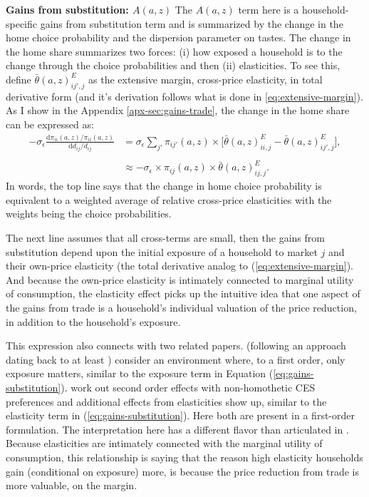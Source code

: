 \documentclass[12pt,pdftex]{article}
\begin{document}
\begin{onehalfspacing}
\textbf{Gains from substitution: $A(a,z)$} The $A(a,z)$ term here is a household-specific gains from substitution term and is summarized by the change in the home choice probability and the dispersion parameter on tastes. The change in the home share summarizes two forces: (i) how exposed a household is to the change through the choice probabilities and then (ii) elasticities. To see this, define $\bar{\theta}(a,z) ^E_{ij',j}$ as the extensive margin, cross-price elasticity, in total derivative form (and it's derivation follows what is done in \ref{eq:extensive-margin}). As I show in the Appendix \ref{apx-sec:gains-trade}, the change in the home share can be expressed as:
\begin{align}
-\sigma_{\epsilon} \frac{\mathrm{d} \pi_{ii}(a,z) / \pi_{ii}(a,z) }{\mathrm{d} d_{ij} / d_{ij}} &= \sigma_{\epsilon} \sum_{j'} \pi_{ij'}(a,z) \times \bigg[ \bar{\theta}(a,z) ^E_{ii,j} - \bar{\theta}(a,z) ^E_{ij',j}\bigg], \\
\nonumber \\
&\approx
-\sigma_{\epsilon} \times \pi_{ij}(a,z) \times \bar{\theta}(a,z) ^E_{ij,j}.
\label{eq:gains-substitution}
\end{align}
In words, the top line says that the change in home choice probability is equivalent to a weighted average of relative cross-price elasticities with the weights being the choice probabilities.

The next line assumes that all cross-terms are small, then the gains from substitution depend upon the initial exposure of a household to market $j$ and their own-price elasticity (the total derivative analog to (\ref{eq:extensive-margin}). And because the own-price elasticity is intimately connected to marginal utility of consumption, the elasticity effect picks up the intuitive idea that one aspect of the gains from trade is a household's individual valuation of the price reduction, in addition to the household's exposure.

This expression also connects with two related papers. \citet{borusyak2021distributional} (following an approach dating back to at least \citet{deaton1989rice}) consider an environment where, to a first order, only exposure matters, similar to the exposure term in Equation (\ref{eq:gains-substitution}). \citet{auer2022unequal} work out second order effects with non-homothetic CES preferences and additional effects from elasticities show up, similar to the elasticity term in (\ref{eq:gains-substitution}). Here both are present in a first-order formulation. The interpretation here has a different flavor than articulated in \citet{auer2022unequal}. Because elasticities are intimately connected with the marginal utility of consumption, this relationship is saying that the reason high elasticity households gain (conditional on exposure) more, is because the price reduction from trade is more valuable, on the margin.


\end{onehalfspacing}
\end{document}

